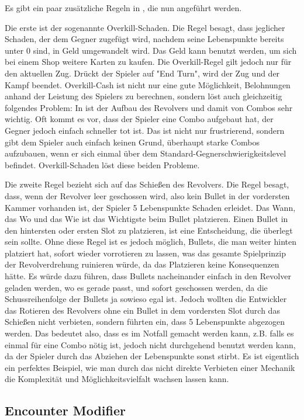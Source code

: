 Es gibt ein paar zusätzliche Regeln in \FF, die nun angeführt werden.


Die erste ist der sogenannte Overkill-Schaden.
Die Regel besagt, dass jeglicher Schaden, der dem Gegner zugefügt wird, nachdem seine Lebenspunkte bereits unter 0 sind,
in Geld umgewandelt wird. Das Geld kann benutzt werden, um sich bei einem Shop weitere Karten zu kaufen.
Die Overkill-Regel gilt jedoch nur für den aktuellen Zug. Drückt der Spieler auf "End Turn", wird der Zug und der Kampf beendet.
Overkill-Cash ist nicht nur eine gute Möglichkeit, Belohnungen anhand der Leistung des Spielers zu berechnen,
sondern löst auch gleichzeitig folgendes Problem: In \FF ist der Aufbau des Revolvers und damit von Combos sehr wichtig.
Oft kommt es vor, dass der Spieler eine Combo aufgebaut hat, der Gegner jedoch einfach schneller tot ist.
Das ist nicht nur frustrierend, sondern gibt dem Spieler auch einfach keinen Grund, überhaupt starke Combos aufzubauen,
wenn er sich einmal über dem Standard-Gegnerschwierigkeitslevel befindet. Overkill-Schaden löst diese beiden Probleme.


Die zweite Regel bezieht sich auf das Schießen des Revolvers.
Die Regel besagt, dass, wenn der Revolver leer geschossen wird, also kein Bullet in der vordersten Kammer vorhanden ist,
der Spieler 5 Lebenspunkte Schaden erleidet. Das Wann, das Wo und das Wie ist das Wichtigste beim Bullet platzieren.
Einen Bullet in den hintersten oder ersten Slot zu platzieren, ist eine Entscheidung, die überlegt sein sollte.
Ohne diese Regel ist es jedoch möglich, Bullets, die man weiter hinten platziert hat, sofort wieder vorrotieren zu lassen,
was das gesamte Spielprinzip der Revolverdrehung ruinieren würde, da das Platzieren keine Konsequenzen hätte.
Es würde dazu führen, dass Bullets nacheinander einfach in den Revolver geladen werden, wo es gerade passt, und sofort
geschossen werden, da die Schussreihenfolge der Bullets ja sowieso egal ist. Jedoch wollten die Entwickler das Rotieren
des Revolvers ohne ein Bullet in dem vordersten Slot durch das Schießen nicht verbieten, sondern führten ein,
dass 5 Lebenspunkte abgezogen werden. Das bedeutet also, dass es im Notfall gemacht werden kann, z.B. falls es einmal für
eine Combo nötig ist, jedoch nicht durchgehend benutzt werden kann, da der Spieler durch das Abziehen der Lebenspunkte sonst stirbt.
Es ist eigentlich ein perfektes Beispiel, wie man durch das nicht direkte Verbieten einer Mechanik die Komplexität und
Möglichkeitsvielfalt wachsen lassen kann.


\subsection{Encounter Modifier}\label{encounter_modifier}

